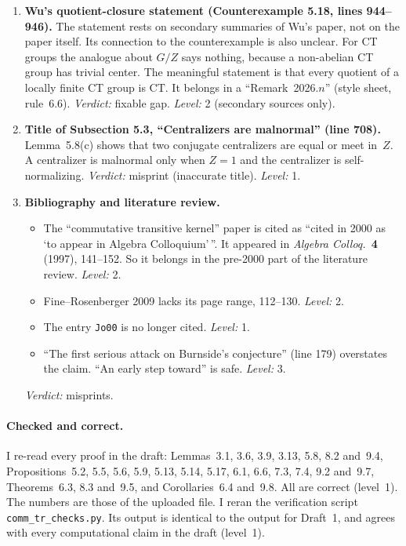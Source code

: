\documentclass[12pt,letterpaper]{article}
\begin{document}
\begin{enumerate}[label=\textbf{C\arabic*.},leftmargin=*,itemsep=4pt]
\item \textbf{Wu's quotient-closure statement (Counterexample 5.18, lines
  944--946).} The statement rests on secondary summaries of Wu's paper, not
  on the paper itself. Its connection to the counterexample is also unclear.
  For CT groups the analogue about $G/Z$ says nothing, because a non-abelian
  CT group has trivial center. The meaningful statement is that every
  quotient of a locally finite CT group is CT. It belongs in a
  ``Remark~2026.$n$'' (style sheet, rule~6.6). \emph{Verdict:} fixable gap.
  \emph{Level:} 2 (secondary sources only).

\item \textbf{Title of Subsection 5.3, ``Centralizers are malnormal''
  (line 708).} Lemma~5.8(c) shows that two conjugate centralizers are equal
  or meet in~$Z$. A centralizer is malnormal only when $Z=1$ and the
  centralizer is self-normalizing. \emph{Verdict:} misprint (inaccurate
  title). \emph{Level:} 1.

\item \textbf{Bibliography and literature review.}
  \begin{itemize}[itemsep=1pt]
  \item The ``commutative transitive kernel'' paper is cited as ``cited in
    2000 as `to appear in Algebra Colloquium'\,''. It appeared in
    \emph{Algebra Colloq.}\ \textbf{4} (1997), 141--152. So it belongs in
    the pre-2000 part of the literature review. \emph{Level:} 2.
  \item Fine--Rosenberger 2009 lacks its page range, 112--130.
    \emph{Level:} 2.
  \item The entry \texttt{Jo00} is no longer cited. \emph{Level:} 1.
  \item ``The first serious attack on Burnside's conjecture'' (line 179)
    overstates the claim. ``An early step toward'' is safe. \emph{Level:} 3.
  \end{itemize}
  \emph{Verdict:} misprints.
\end{enumerate}

\paragraph{Checked and correct.} I re-read every proof in the draft:
Lemmas~3.1, 3.6, 3.9, 3.13, 5.8, 8.2 and~9.4, Propositions~5.2, 5.5, 5.6,
5.9, 5.13, 5.14, 5.17, 6.1, 6.6, 7.3, 7.4, 9.2 and~9.7,
Theorems~6.3, 8.3 and~9.5, and Corollaries~6.4 and~9.8. All are correct
(level~1). The numbers are those of the uploaded file. I reran the
verification script \texttt{comm\_tr\_checks.py}. Its output is identical to
the output for Draft~1, and agrees with every computational claim in the
draft (level~1).
\end{document}
